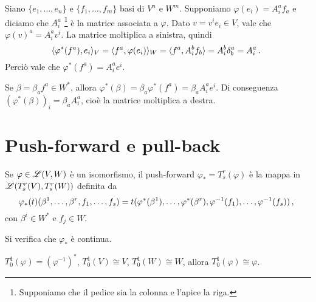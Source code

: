 Siano $\{e_1,\dots, e_n\}$ e $\{f_1,\dots, f_m\}$ basi di $V^n$ e $W^m$. Supponiamo $\varphi(e_i) = A_i^af_a$ e diciamo che $A_i^a$ \footnote{Supponiamo che il pedice sia la colonna e l'apice la riga.} è la matrice associata a $\varphi$.
Dato $v = v^ie_i\in V$, vale che $\varphi(v)^a = A_i^a v^i$.
La matrice moltiplica a sinistra, quindi
\begin{equation*}
	\langle \varphi^*(f^a) , e_i \rangle_V = \langle f^a , \varphi(e_i) \rangle_W = \langle f^a , A_i^b f_b \rangle = A_i^b\delta_b^a = A_i^a\, \text{. }
\end{equation*}
Perciò vale che $\varphi^*(f^a) = A_i^a e^i$.

Se $\beta = \beta_a f^a \in W^*$, allora $\varphi^*(\beta) = \beta_a \varphi^*(f^a) = \beta_aA_i^ae^i$.
Di conseguenza $(\varphi^*(\beta))_i = \beta_aA_i^a$, cioè la matrice moltiplica a destra.

\section{Push-forward e pull-back}

\begin{definition} 
	Se $\varphi \in \mathscr L(V,W)$ è un isomorfismo, il push-forward $\varphi_* = T_s^r(\varphi)$ è la mappa in $\mathscr L(T_s^r(V), T_s^r(W))$ definita da
	\begin{equation*}
		\varphi_*(t) (\beta^1,\dots,\beta^r,f_1,\dots,f_s) = t(\varphi^*(\beta^1),\dots,\varphi^*(\beta^r), \varphi^{-1}(f_1),\dots, \varphi^{-1}(f_s)) \, \text{, }
	\end{equation*}
	con $\beta^i\in W^*$ e $f_j\in W$.
\end{definition}

Si verifica che $\varphi_*$ è continua.

\begin{remark} %
	$T_0^1(\varphi) = (\varphi^{-1})^*$, $T_0^1(V)\cong V$, $T_0^1(W)\cong W$, allora $T_0^1(\varphi)\cong\varphi$.
\end{remark}

